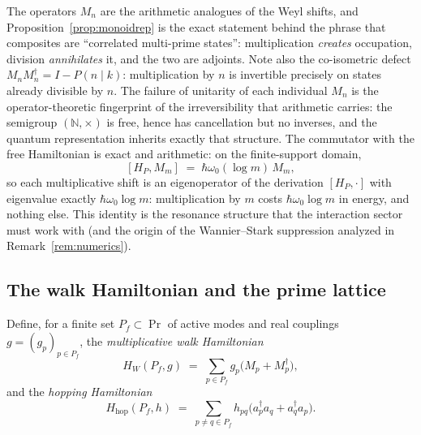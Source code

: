 \documentclass[11pt,a4paper]{article}
\theoremstyle{plain}
\theoremstyle{definition}
\theoremstyle{remark}
\newcommand{\Nn}{\mathbb{N}}
\begin{document}
The operators $M_{n}$ are the arithmetic analogues of the Weyl shifts, and
Proposition~\ref{prop:monoidrep} is the exact statement behind the phrase that
composites are ``correlated multi-prime states'': multiplication \emph{creates} occupation,
division \emph{annihilates} it, and the two are adjoints. Note also the co-isometric defect
$M_{n}M_{n}^{\dagger}=I-P(n\mid k)$: multiplication by $n$ is invertible precisely on states
already divisible by $n$. The failure of unitarity of each individual $M_{n}$ is the
operator-theoretic fingerprint of the irreversibility that arithmetic carries:
the semigroup $(\Nn,\times)$ is
free, hence has cancellation but no inverses, and the quantum representation inherits exactly
that structure. The commutator with the free Hamiltonian is exact and arithmetic: on the
finite-support domain,
\begin{equation}\label{eq:commMm}
[H_{P},M_{m}]\;=\;\hbar\omega_{0}(\log m)\,M_{m},
\end{equation}
so each multiplicative shift is an eigenoperator of the derivation $[H_{P},\cdot]$ with
eigenvalue exactly $\hbar\omega_{0}\log m$: multiplication by $m$ costs $\hbar\omega_{0}\log m$
in energy, and nothing else. This identity is the resonance structure that the interaction
sector must work with (and the origin of the Wannier--Stark suppression analyzed in
Remark~\ref{rem:numerics}).

\subsection{The walk Hamiltonian and the prime lattice}\label{sec:walk}

Define, for a finite set $P_{f}\subset\Pr$ of active modes and real couplings
$g=(g_{p})_{p\in P_{f}}$, the \emph{multiplicative walk Hamiltonian}
\begin{equation}\label{eq:walkH}
H_{W}(P_{f},g)\;=\;\sum_{p\in P_{f}}g_{p}\bigl(M_{p}+M_{p}^{\dagger}\bigr),
\end{equation}
and the \emph{hopping Hamiltonian}
\begin{equation}\label{eq:hopH}
H_{\mathrm{hop}}(P_{f},h)\;=\;\sum_{p\neq q\in P_{f}}h_{pq}
\bigl(a_{p}^{\dagger}a_{q}+a_{q}^{\dagger}a_{p}\bigr).
\end{equation}
\end{document}
